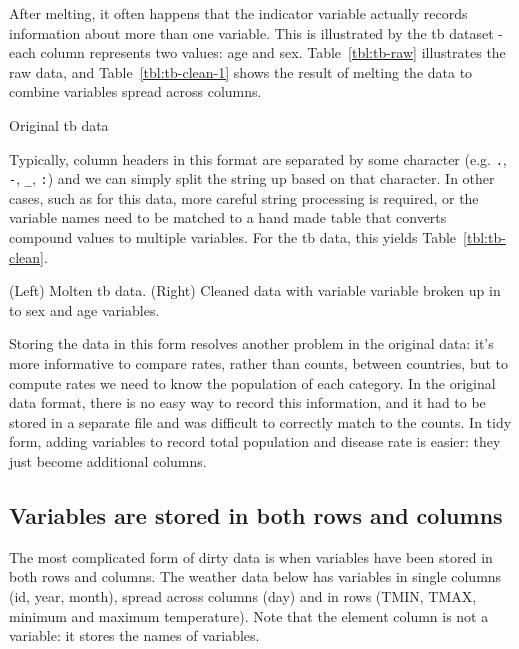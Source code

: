 \documentclass[oneside]{article}
\begin{document}
After melting, it often happens that the indicator variable actually records information about more than one variable. This is illustrated by the tb dataset - each column represents two values: age and sex.  Table~\ref{tbl:tb-raw} illustrates the raw data, and Table~\ref{tbl:tb-clean-1} shows the result of melting the data to combine variables spread across columns.

\begin{table}[htbp]
  \centering
  
  \caption{Original tb data}
  \label{tbl:tb-raw}
\end{table}

Typically, column headers in this format are separated by some character (e.g. {\tt .}, {\tt -}, {\tt \_}, {\tt :}) and we can simply split the string up based on that character.  In other cases, such as for this data, more careful string processing is required, or the variable names need to be matched to a hand made table that converts compound values to multiple variables. For the tb data, this yields Table~\ref{tbl:tb-clean}.

\begin{table}[htbp]
  \centering
  
  
  \caption{(Left) Molten tb data. (Right) Cleaned data with variable variable broken up in to sex and age variables.}
  \label{tbl:tb-clean}
\end{table}

Storing the data in this form resolves another problem in the original data: it's more informative to compare rates, rather than counts, between countries, but to compute rates we need to know the population of each category. In the original data format, there is no easy way to record this information, and it had to be stored in a separate file and was difficult to correctly match to the counts. In tidy form, adding variables to record total population and disease rate is easier: they just become additional columns.

\subsection{Variables are stored in both rows and columns}

The most complicated form of dirty data is when variables have been stored in both rows and columns. The weather data below has variables in single columns (id, year, month), spread across columns (day) and in rows (TMIN, TMAX, minimum and maximum temperature).  Note that the element column is not a variable: it stores the names of variables.
\end{document}
